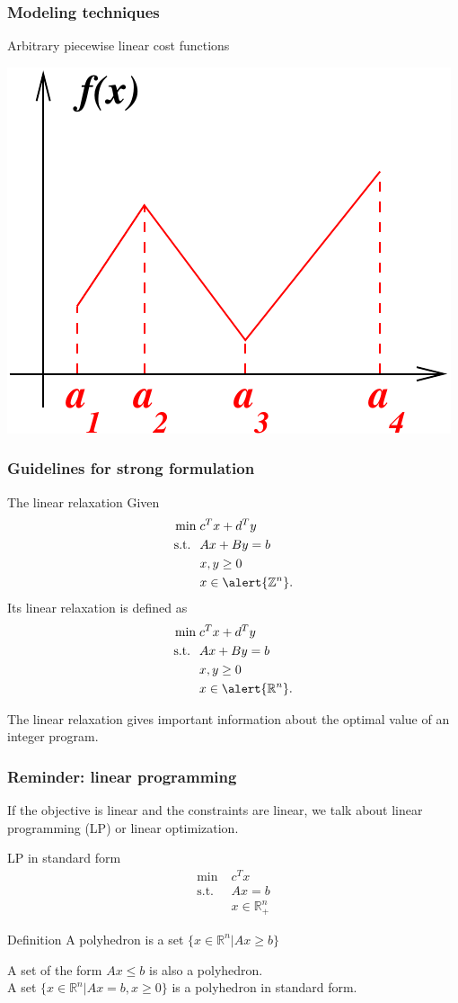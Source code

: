 \documentclass[9pt,handout]{beamer}
\newcommand{\Z}       {\mathbb{Z} }
\newcommand{\R}       {\mathbb{R} }
\newcommand{\st}{\mathrm{s.t.}}
\begin{document}
\begin{frame}
\frametitle{Modeling techniques}
\begin{block}{Arbitrary piecewise linear cost functions}
\begin{center}
\includegraphics[width=.4\linewidth]{piecewise.pdf}
\end{center}
\end{block}
\end{frame}
\begin{frame}
\frametitle{Guidelines for strong formulation}
\begin{block}{The linear relaxation}
Given
\begin{align*}
\min\;& c^Tx+d^Ty\\
\text{s.t. }\;& Ax+By=b\\
&x,y\geq 0\\
&x\in\alert{\Z^n}.
\end{align*}
Its  \alert{linear relaxation} is defined as 
\begin{align*}
\min\;& c^Tx+d^Ty\\
\text{s.t. }\;& Ax+By=b\\
&x,y\geq 0\\
&x\in\alert{\R^n}.
\end{align*}
\end{block}
The linear relaxation gives important information about
the optimal value of an integer program.
\end{frame}
\begin{frame}
\frametitle{Reminder: linear programming}
If the objective is \alert{linear} and the constraints are \alert{linear},
we talk about \alert{linear programming} (LP) or \alert{linear optimization}.
\begin{block}{LP in standard form}
\begin{align*}
\min\; & c^T x\\
\st \;& Ax=b\\
& x\in \R^n_+
\end{align*}
\end{block}
\begin{block}{Definition}
A \alert{polyhedron} is a set $\{x\in \R^n|Ax\geq b\}$
\end{block}
A set of the      form  $Ax\leq b$ is also a polyhedron.\\
A set $\{x\in \R^n| Ax=b, x\geq 0\}$ is a polyhedron in \alert{standard form}.
\end{frame}
\end{document}
